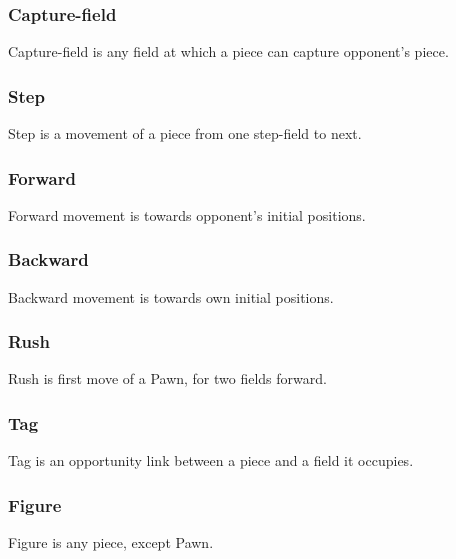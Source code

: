 \subsubsection*{Capture-field}
\label{sec:Classical Chess/Variants/Terms/Capture-field}
Capture-field is any field at which a piece can capture opponent's piece.

\subsubsection*{Step}
\label{sec:Classical Chess/Variants/Terms/Step}
Step is a movement of a piece from one step-field to next.

\subsubsection*{Forward}
\label{sec:Classical Chess/Variants/Terms/Forward}
Forward movement is towards opponent's initial positions.

\subsubsection*{Backward}
\label{sec:Classical Chess/Variants/Terms/Backward}
Backward movement is towards own initial positions.

\subsubsection*{Rush}
\label{sec:Classical Chess/Variants/Terms/Rush}
Rush is first move of a Pawn, for two fields forward.

\subsubsection*{Tag}
\label{sec:Classical Chess/Variants/Terms/Tag}
Tag is an opportunity link between a piece and a field it occupies.

\subsubsection*{Figure}
\label{sec:Classical Chess/Variants/Terms/Figure}
Figure is any piece, except Pawn.

\clearpage %
